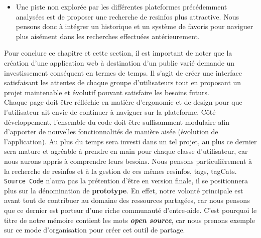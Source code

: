 \begin{itemize}
    \item Une piste non explorée par les différentes plateformes précédemment analysées est de proposer une recherche de \glspl{resinfo} plus attractive. Nous pensons donc à intégrer un historique et un système de favoris pour naviguer plus aisément dans les recherches effectuées antérieurement.
\end{itemize}

\pagebreak
Pour conclure ce chapitre et cette section, il est important de noter que la création d'une application web à destination d'un public varié demande un investissement conséquent en termes de temps. Il s'agit de créer une interface satisfaisant les attentes de chaque groupe d'utilisateurs tout en proposant un projet maintenable et évolutif pouvant satisfaire les besoins futurs.\\

Chaque page doit être réfléchie en matière d'ergonomie et de design pour que l'utilisateur ait envie de continuer à naviguer sur la plateforme. Côté développement, l'ensemble du code doit être suffisamment modulaire afin d'apporter de nouvelles fonctionnalités de manière aisée (évolution de l'application). Au plus du temps sera investi dans un tel projet, au plus ce dernier sera mature et agréable à prendre en main pour chaque classe d'utilisateur, car nous aurons appris à comprendre leurs besoins. Nous pensons particulièrement à la recherche de \glspl{resinfo} et à la gestion de ces mêmes \glspl{resinfo}, \glspl{tag}, \glspl{tagCat}.\\

\texttt{Source Code} n'aura pas la prétention d'être en version finale, il se positionnera plus sur la dénomination de \textbf{prototype}. En effet, notre volonté principale est avant tout de contribuer au domaine des ressources partagées, car nous pensons que ce dernier est porteur d'une riche communauté d'entre-aide. C'est pourquoi le titre de notre mémoire contient les mots \textbf{\textit{open source}}, car nous prenons exemple sur ce mode d'organisation pour créer cet outil de partage.
